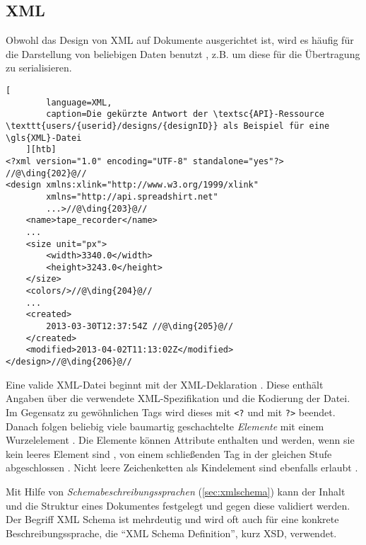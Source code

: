 \subsection{XML}
\label{sec:xml}


Obwohl das Design von \gls{XML} auf Dokumente ausgerichtet ist, wird es häufig für die Darstellung von beliebigen Daten benutzt \cite{wiki:xml}, z.B. um diese für die Übertragung zu serialisieren.

\begin{lstlisting}[
        language=XML, 
        caption=Die gekürzte Antwort der \textsc{API}-Ressource \texttt{users/{userid}/designs/{designID}} als Beispiel für eine \gls{XML}-Datei
    ][htb]
<?xml version="1.0" encoding="UTF-8" standalone="yes"?> //@\ding{202}@//
<design xmlns:xlink="http://www.w3.org/1999/xlink" 
        xmlns="http://api.spreadshirt.net" 
        ...>//@\ding{203}@//
    <name>tape_recorder</name>
    ...
    <size unit="px">
        <width>3340.0</width>
        <height>3243.0</height>
    </size>
    <colors/>//@\ding{204}@//
    ...
    <created>
        2013-03-30T12:37:54Z //@\ding{205}@//
    </created>
    <modified>2013-04-02T11:13:02Z</modified>
</design>//@\ding{206}@//
\end{lstlisting}

Eine valide \gls{XML}-Datei beginnt mit der \gls{XML}-Deklaration . Diese enthält Angaben über die verwendete \gls{XML}-Spezifikation und die Kodierung der Datei. 
Im Gegensatz zu gewöhnlichen Tags wird dieses mit \texttt{<?} und mit \texttt{?>} beendet. 
Danach folgen beliebig viele baumartig geschachtelte \emph{Elemente} mit einem Wurzelelement . Die Elemente können Attribute enthalten und werden, wenn sie kein leeres Element sind , von einem schließenden Tag in der gleichen Stufe abgeschlossen . Nicht leere Zeichenketten als Kindelement sind ebenfalls erlaubt .

Mit Hilfe von \emph{Schemabeschreibungssprachen} (\cref{sec:xmlschema}) kann der Inhalt und die Struktur eines Dokumentes festgelegt und gegen diese validiert werden. Der Begriff \gls{XML} Schema ist mehrdeutig und wird oft auch für eine konkrete Beschreibungssprache, die \enquote{\gls{XML} Schema Definition}, kurz \gls{XSD}, verwendet.
